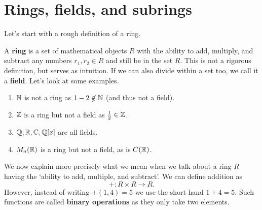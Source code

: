\chapter{Rings, fields, and subrings}

Let's start with a rough definition of a ring.

A \textbf{ring} is a set of mathematical objects $R$ with the ability to add, multiply, and subtract any numbers $r_1, r_2 \in R$ and still be in the set $R$. This is not a rigorous definition, but serves as intuition. If we can also divide within a set too, we call it a \textbf{field}. Let's look at some examples.

\begin{enumerate}
    \item $\mathbb{N}$ is not a ring as $1 - 2 \not \in \mathbb{N}$ (and thus not a field).
    \item $\mathbb{Z}$ is a ring but not a field as $\frac12 \in \mathbb{Z}$.
    \item $\mathbb{Q}, \mathbb{R}, \mathbb{C}, \mathbb{Q}[x]$ are all fields.
    \item $M_n(\mathbb{R})$ is a ring but not a field, as is $C(\mathbb{R})$.
\end{enumerate}

We now explain more precisely what we mean when we talk about a ring $R$ having the `ability to add, multiple, and subtract'. We can define addition as \[ +: R \times R \to R. \] However, instead of writing $+(1,4)=5$ we use the short hand $1+4=5$. Such functions are called \textbf{binary operations} as they only take two elements. 
